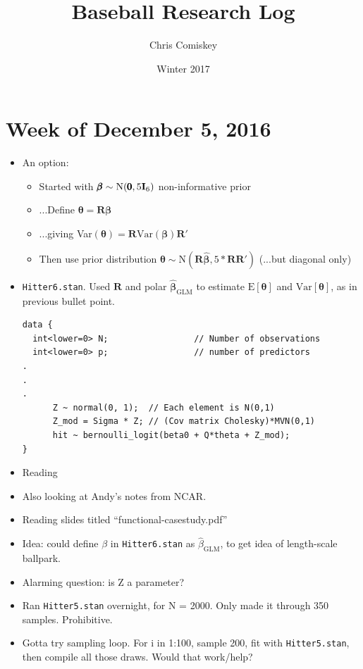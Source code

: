 \documentclass{article}
\title{Baseball Research Log}
\author{Chris Comiskey}
\date{Winter 2017}
\begin{document}
\maketitle{}

\section*{Week of December 5, 2016} %
\begin{itemize}
\item An option:
      \begin{itemize}
      \item Started with $\pmb{\beta} \sim \text{N}(\pmb{0}, 5 \text{{\bf I}}_{6})$ non-informative prior 
      \item ...Define $\pmb{\theta} = \pmb{R \beta}$
      \item ...giving Var$(\pmb{\theta}) = \pmb{R}\text{Var}(\pmb{\beta})\pmb{R}'$
      \item Then use prior distribution $\pmb{\theta} \sim \text{N}(\pmb{R \hat{\beta}}, 5 *\pmb{R R'})$ (...but diagonal only)
      \end{itemize}
\item \verb|Hitter6.stan|. Used $\pmb{R}$ and polar $\hat{\pmb{\beta}}_{\text{GLM}}$ to estimate $\text{E}[\pmb{\theta}]$ and $\text{Var}[\pmb{\theta}]$, as in previous bullet point.
\begin{verbatim}
data {                             
  int<lower=0> N;                 // Number of observations
  int<lower=0> p;                 // number of predictors
.
.
.
      Z ~ normal(0, 1);  // Each element is N(0,1)
      Z_mod = Sigma * Z; // (Cov matrix Cholesky)*MVN(0,1)
      hit ~ bernoulli_logit(beta0 + Q*theta + Z_mod);
}
\end{verbatim}
\item Reading \cite{Finley2007}
\item Also looking at Andy's notes from NCAR. 
\item Reading slides titled ``functional-casestudy.pdf''
\item Idea: could define $\beta$ in \verb|Hitter6.stan| as $\hat{\beta}_{\text{GLM}}$, to get idea of length-scale ballpark.
\item Alarming question: is Z a parameter?
\item Ran \verb|Hitter5.stan| overnight, for N = 2000. Only made it through 350 samples. Prohibitive.
\item Gotta try sampling loop. For i in 1:100, sample 200, fit with \verb|Hitter5.stan|, then compile all those draws. Would that work/help?

\end{itemize}
\end{document}
